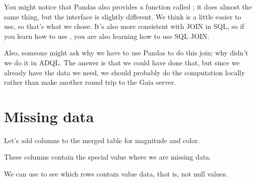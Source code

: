 \documentclass[letterpaper,10pt,english]{sphinxmanual}
\begin{document}
 You might notice that Pandas also provides a function called ; it does almost the same thing, but the interface is slightly different.  We think  is a little easier to use, so that’s what we chose.  It’s also more consistent with JOIN in SQL, so if you learn how to use , you are also learning how to use SQL JOIN.

Also, someone might ask why we have to use Pandas to do this join; why didn’t we do it in ADQL.  The answer is that we could have done that, but since we already have the data we need, we should probably do the computation locally rather than make another round trip to the Gaia server.


\section{Missing data}
\label{\detokenize{06_photo:missing-data}}
Let’s add columns to the merged table for magnitude and color.

\begin{sphinxVerbatim}[commandchars=\\\{\}]
\PYG{p}{[}\PYG{p}{]}  \PYG{p}{[}\PYG{p}{]}
\PYG{p}{[}\PYG{p}{]}  \PYG{p}{[}\PYG{p}{]}  \PYG{p}{[}\PYG{p}{]}
\end{sphinxVerbatim}

These columns contain the special value  where we are missing data.

We can use  to see which rows contain value data, that is, not null values.

\begin{sphinxVerbatim}[commandchars=\\\{\}]
\PYG{p}{[}\PYG{p}{]}
\end{sphinxVerbatim}
\end{document}
